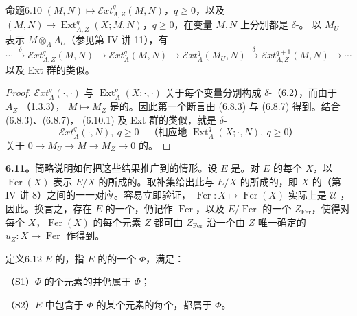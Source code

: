 \begin{SGAresult}{命题}{6.10}
 $(M,N)\mapsto\mathscr Ext_{A,Z}^q(M,N)$，$q\geq0$，以及 $(M,N)\mapsto\operatorname{Ext}_{A,Z}^q(X;M,N)$，$q\geq0$，在变量 $M,N$ 上分别都是 $\delta$-。
以 $M_U$ 表示 $M\otimes_A A_U$（参见第 IV 讲 11），有
\begin{equation}\cdots\xrightarrow{\delta}\mathscr Ext_{A,Z}^q(M,N)\to\mathscr Ext_A^q(M,N)\to\mathscr Ext_A^q(M_U,N)\xrightarrow{\delta}\mathscr Ext_{A,Z}^{q+1}(M,N)\to\cdots\tag{6.10.1}\end{equation}
以及 Ext 群的类似。
\end{SGAresult}
\begin{proof}
 $\mathscr Ext_A^q(\cdot,\cdot)$ 与 $\operatorname{Ext}_A^q(X;\cdot,\cdot)$ 关于每个变量分别构成 $\delta$-（6.2），而由于 $A_Z$ （1.3.3）， $M\mapsto M_Z$ 是的。因此第一个断言由 (6.8.3) 与 (6.8.7) 得到。结合 (6.8.3)、(6.8.7)， (6.10.1) 及 Ext 群的类似，就是 $\delta$-
\[\mathscr Ext_A^q(\cdot,N),\ q\geq0\quad\text{（相应地 }\operatorname{Ext}_A^q(X;\cdot,N),\ q\geq0\text{）}\]
关于 $0\to M_U\to M\to M_Z\to0$ 的。
\end{proof}
\textbf{6.11。}简略说明如何把这些结果推广到的情形。设 $E$ 是。对 $E$ 的每个 $X$，以 $\operatorname{Fer}(X)$ 表示 $E/X$ 的所成的。取补集给出此与 $E/X$ 的所成的，即 $X$ 的（第 IV 讲 8）之间的一一对应。容易立即验证， $\operatorname{Fer}:X\mapsto\operatorname{Fer}(X)$ 实际上是 $\mathcal U$-，因此。换言之，存在 $E$ 的一个，仍记作 $\operatorname{Fer}$，以及 $E/\operatorname{Fer}$ 的一个 $Z_{\operatorname{Fer}}$，使得对每个 $X$，$\operatorname{Fer}(X)$ 的每个元素 $Z$ 都可由 $Z_{\operatorname{Fer}}$ 沿一个由 $Z$ 唯一确定的 $u_Z:X\to\operatorname{Fer}$ 作得到。
\begin{SGAresult}{定义}{6.12}
$E$ 的，指 $E$ 的的一个 $\Phi$，满足：

（S1）$\Phi$ 的个元素的并仍属于 $\Phi$；

（S2）$E$ 中包含于 $\Phi$ 的某个元素的每个，都属于 $\Phi$。
\end{SGAresult}
